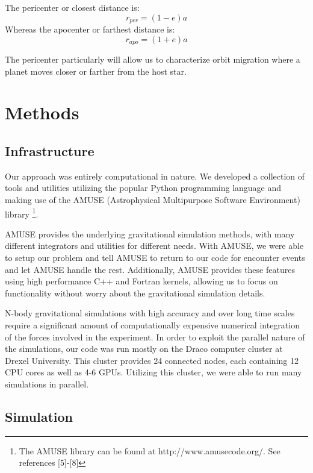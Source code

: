 \documentclass[12pt]{article}
\begin{document}
    The pericenter or closest distance is:
    \begin{equation}
        r_{per} = (1 - e) a
    \end{equation}
    Whereas the apocenter or farthest distance is:
    \begin{equation}
        r_{apo} = (1 + e) a
    \end{equation}

    The pericenter particularly will allow us to characterize orbit migration where a
    planet moves closer or farther from the host star.

\section{Methods}

    \subsection{Infrastructure}

    Our approach was entirely computational in nature. We developed a collection of tools
    and utilities utilizing the popular Python programming language and making use
    of the AMUSE (Astrophysical Multipurpose Software Environment) library \footnote{The AMUSE library can be found at http://www.amusecode.org/. See references [5]-[8]}. 

    AMUSE provides the underlying gravitational simulation methods, with many different
    integrators and utilities for different needs. With AMUSE, we were able to 
    setup our problem and tell AMUSE to return to our code for encounter events and
    let AMUSE handle the rest. Additionally, AMUSE provides these features using high
    performance C++ and Fortran kernels, allowing us to focus on functionality without
    worry about the gravitational simulation details.

    N-body gravitational simulations with high accuracy and over long time scales require
    a significant amount of computationally expensive numerical integration of the 
    forces involved in the experiment. In order to exploit the parallel nature of 
    the simulations, our code was run mostly on the Draco computer 
    cluster at Drexel University. This cluster provides 24 connected nodes, each containing
    12 CPU cores as well as 4-6 GPUs. Utilizing this cluster, we were able to run many simulations in parallel.

    \subsection{Simulation}
\end{document}

